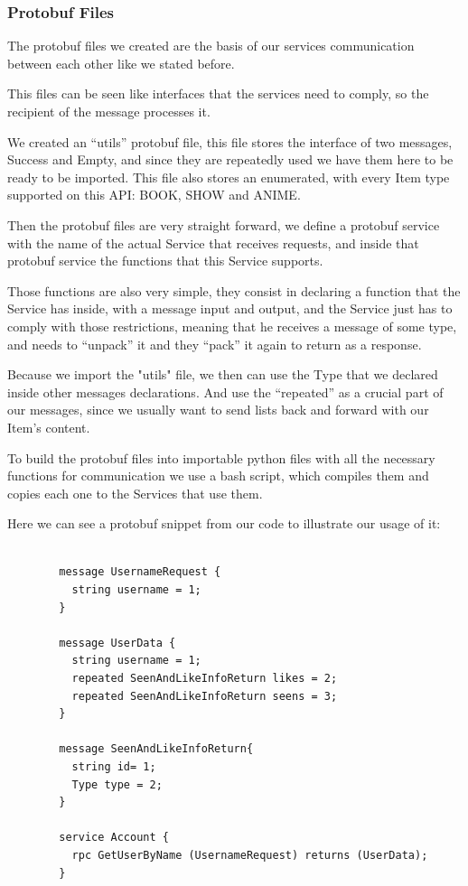 \documentclass[oneside]{article}
\newcommand*\fpar{\hspace{1ex}}
\begin{document}
      \subsubsection{Protobuf Files}
      \fpar The protobuf files we created are the basis of our services communication between each other like we stated before.
      \par This files can be seen like interfaces that the services need to comply, so the recipient of the message processes it.
      \par We created an “utils” protobuf file, this file stores the interface of two messages, Success and Empty, and since they are repeatedly used we have them here to be ready to be imported. This file also stores an enumerated, with every Item type supported on this API: BOOK, SHOW and ANIME.
      \par Then the protobuf files are very straight forward, we define a protobuf service with the name of the actual Service that receives requests, and inside that protobuf service the functions that this Service supports.
      \par Those functions are also very simple, they consist in declaring a function that the Service has inside, with a message input and output, and the Service just has to comply with those restrictions, meaning that he receives a message of some type, and needs to “unpack” it and they “pack” it again to return as a response.
      \par Because we import the "utils" file, we then can use the Type that we declared inside other messages declarations. And use the “repeated” as a crucial part of our messages, since we usually want to send lists back and forward with our Item's content.
      \par To build the protobuf files into importable python files with all the necessary functions for communication we use a bash script, which compiles them and copies each one to the Services that use them.
      \par Here we can see a protobuf snippet from our code to illustrate our usage of it:
      \begin{lstlisting}

        message UsernameRequest {
          string username = 1;
        }

        message UserData {
          string username = 1;
          repeated SeenAndLikeInfoReturn likes = 2;
          repeated SeenAndLikeInfoReturn seens = 3;
        }

        message SeenAndLikeInfoReturn{
          string id= 1;
          Type type = 2;
        }

        service Account {
          rpc GetUserByName (UsernameRequest) returns (UserData);
        }
      
      \end{lstlisting}
\end{document}
